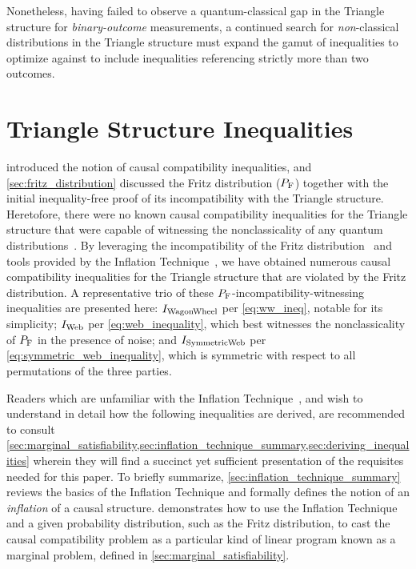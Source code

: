 \documentclass[aps, 10pt, english, twoside, pra, nofootinbib, tightenlines, longbibliography, superscriptaddress]{revtex4-1}
\begin{document}
    Nonetheless, having failed to observe a quantum-classical gap in the Triangle structure for \textit{binary-outcome} measurements, a continued search for \emph{non}-classical distributions in the Triangle structure must expand the gamut of inequalities to optimize against to include inequalities referencing strictly more than two outcomes.

    \section{Triangle Structure Inequalities}
    \label{sec:found_inequalities}

     introduced the notion of causal compatibility inequalities, and \cref{sec:fritz_distribution} discussed the Fritz distribution ($\prob[\fritz]$) together with the initial inequality-free proof of its incompatibility with the Triangle structure. Heretofore, there were no known causal compatibility inequalities for the Triangle structure that were capable of witnessing the nonclassicality of any quantum distributions~\cite{Inflation}. By leveraging the incompatibility of the Fritz distribution~\cite{Fritz_2012} and tools provided by the Inflation Technique~\cite{Inflation}, we have obtained numerous causal compatibility inequalities for the Triangle structure that are violated by the Fritz distribution. A representative trio of these $\prob[\fritz]$-incompatibility-witnessing inequalities are presented here: $I_\text{WagonWheel}$ per \cref{eq:ww_ineq}, notable for its simplicity; $I_\text{Web}$ per \cref{eq:web_inequality}, which best witnesses the nonclassicality of $\prob[\fritz]$ in the presence of noise; and $I_\text{SymmetricWeb}$ per \cref{eq:symmetric_web_inequality}, which is symmetric with respect to all permutations of the three parties.

    Readers which are unfamiliar with the Inflation Technique~\cite{Inflation}, and wish to understand in detail how the following inequalities are derived, are recommended to consult \cref{sec:marginal_satisfiability,sec:inflation_technique_summary,sec:deriving_inequalities} wherein they will find a succinct yet sufficient presentation of the requisites needed for this paper. To briefly summarize, \cref{sec:inflation_technique_summary} reviews the basics of the Inflation Technique and formally defines the notion of an \textit{inflation} of a causal structure.  demonstrates how to use the Inflation Technique and a given probability distribution, such as the Fritz distribution, to cast the causal compatibility problem as a particular kind of linear program known as a marginal problem, defined in \cref{sec:marginal_satisfiability}.
\end{document}
